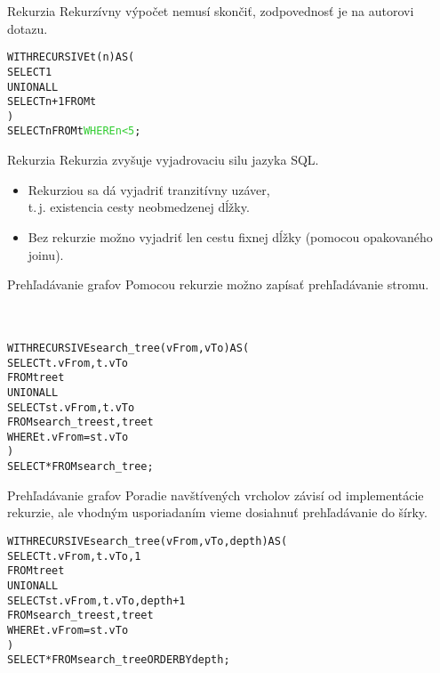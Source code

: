 \documentclass[12pt]{beamer}
\def\blue#1{\textcolor{Cerulean}{#1}}
\def\green#1{\textcolor{LimeGreen}{#1}}
\begin{document}
\begin{frame}[fragile]{Rekurzia}
Rekurzívny výpočet nemusí skončiť, zodpovednosť je na autorovi dotazu.
\bigskip

\begin{alltt}
WITH RECURSIVE t(n) AS (
    SELECT 1
  UNION ALL
    SELECT n+1 FROM t
)
SELECT n FROM t \green{WHERE n < 5};
\end{alltt}
\end{frame}

\begin{frame}[fragile]{Rekurzia}
Rekurzia zvyšuje vyjadrovaciu silu jazyka SQL.
\begin{itemize}
\item Rekurziou sa dá vyjadriť \blue{tranzitívny uzáver},\\ t.\,j. existencia cesty neobmedzenej dĺžky.
\item Bez rekurzie možno vyjadriť len cestu fixnej dĺžky (pomocou opakovaného joinu).
\end{itemize}
\end{frame}

\begin{frame}[fragile]{Prehľadávanie grafov}
Pomocou rekurzie možno zapísať prehľadávanie stromu.\\
\phantom{x}\\ %
\phantom{x}\\
\bigskip

\begin{alltt}
WITH RECURSIVE \alert{search_tree}(vFrom, vTo) AS (
    SELECT t.vFrom, t.vTo
    FROM tree t
  UNION ALL
    SELECT st.vFrom, t.vTo
    FROM \alert{search_tree} st, tree t
    WHERE t.vFrom = st.vTo
)
SELECT * FROM search_tree;
\end{alltt}
\end{frame}

\begin{frame}[fragile]{Prehľadávanie grafov}
Poradie navštívených vrcholov závisí od implementácie rekurzie,
ale vhodným usporiadaním vieme dosiahnuť \alert{prehľadávanie do šírky}.
\bigskip
\begin{alltt}
WITH RECURSIVE search_tree(vFrom, vTo, \alert{depth}) AS (
    SELECT t.vFrom, t.vTo, \alert{1}
    FROM tree t
  UNION ALL
    SELECT st.vFrom, t.vTo, \alert{depth + 1}
    FROM search_tree st, tree t
    WHERE t.vFrom = st.vTo
)
SELECT * FROM search_tree \alert{ORDER BY depth};
\end{alltt}
\end{frame}
\end{document}
